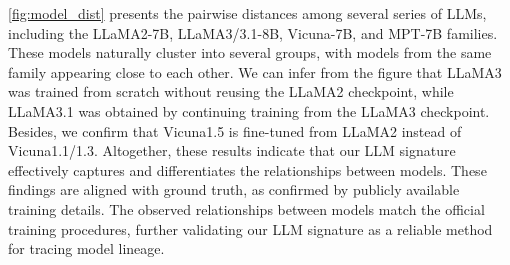 \cref{fig:model_dist} presents the pairwise distances among several series of LLMs, including the LLaMA2-7B, LLaMA3/3.1-8B, Vicuna-7B, and MPT-7B families.
These models naturally cluster into several groups, with models from the same family appearing close to each other.
We can infer from the figure that LLaMA3 was trained from scratch without reusing the LLaMA2 checkpoint, while LLaMA3.1 was obtained by continuing training from the LLaMA3 checkpoint.
Besides, we confirm that Vicuna1.5 is fine-tuned from LLaMA2 instead of Vicuna1.1/1.3.
Altogether, these results indicate that our LLM signature effectively captures and differentiates the relationships between models.
These findings are aligned with ground truth, as confirmed by publicly available training details. The observed relationships between models match the official training procedures, further validating our LLM signature as a reliable method for tracing model lineage.
